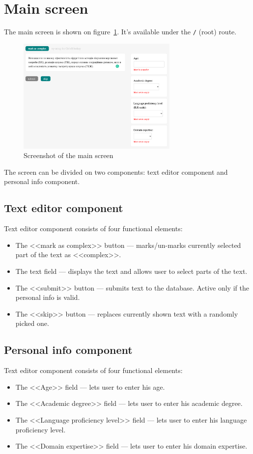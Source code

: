 \documentclass[a4paper,14pt,oneside,final]{memoir}
\begin{document}
\section{Main screen}
The main screen is shown on figure~\ref{fig:ui_main}. It's available under the \texttt{/} (root) route.

\begin{figure}[h]
    \centering
    \includegraphics[width=0.7\textwidth]{fig_ui_main}
    \caption{Screenshot of the main screen}
    \label{fig:ui_main}
\end{figure}

The screen can be divided on two components: text editor component and personal info component.

\subsection{Text editor component}
Text editor component consists of four functional elements: 
\begin{itemize}
    \item The <<mark as complex>> button --- marks/un-marks currently selected part of the text as <<complex>>.
    \item The text field --- displays the text and allows user to select parts of the text.
    \item The <<submit>> button --- submits text to the database. Active only if the personal info is valid.
    \item The <<skip>> button --- replaces currently shown text with a randomly picked one.
\end{itemize}

\subsection{Personal info component}
Text editor component consists of four functional elements: 
\begin{itemize}
    \item The <<Age>> field --- lets user to enter his age.
    \item The <<Academic degree>> field --- lets user to enter his academic degree.
    \item The <<Language proficiency level>> field --- lets user to enter his language proficiency level.
    \item The <<Domain expertise>> field --- lets user to enter his domain expertise.
\end{itemize}
\end{document}
